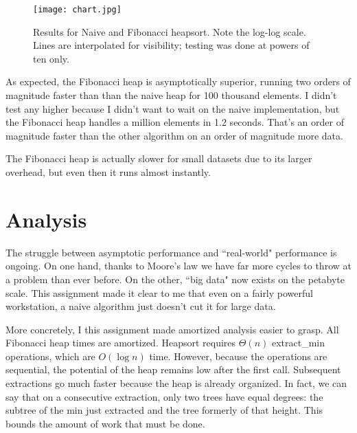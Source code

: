 \documentclass{article}
\begin{document}
\begin{figure}[htb]
  \centering
  \texttt{[image: chart.jpg]}
  \caption{Results for Naive and Fibonacci heapsort. Note the log-log scale.
  Lines are interpolated for visibility; testing was done at powers of ten only.}
\label{fig:results}
\end{figure} 

As expected, the Fibonacci heap is asymptotically superior, running two orders
of magnitude faster than than the naive heap for 100 thousand elements. I didn't
test any higher because I didn't want to wait on the naive implementation, but
the Fibonacci heap handles a million elements in 1.2 seconds. That's an
order of magnitude faster than the other algorithm on an order of magnitude more
data.

The Fibonacci heap is actually slower for small datasets due to its larger
overhead, but even then it runs almost instantly.

\section{Analysis}
The struggle between asymptotic performance and ``real-world" performance is
ongoing. On one hand, thanks to Moore's law we have far more cycles to throw at
a problem than ever before. On the other, ``big data" now exists on the petabyte
scale. This assignment made it clear to me that even on a fairly powerful
workstation, a naive algorithm just doesn't cut it for large data.

More concretely, I this assignment made amortized analysis easier to grasp. All
Fibonacci heap times are amortized. Heapsort requires $\Theta(n)$ extract\_min
operations, which are $O(\log n)$ time. However, because the operations are
sequential, the potential of the heap remains low after the first call.
Subsequent extractions go much faster because the heap is already organized. In
fact, we can say that on a consecutive extraction, only two trees have equal
degrees: the subtree of the min just extracted and the tree formerly of that
height. This bounds the amount of work that must be done.
\end{document}
